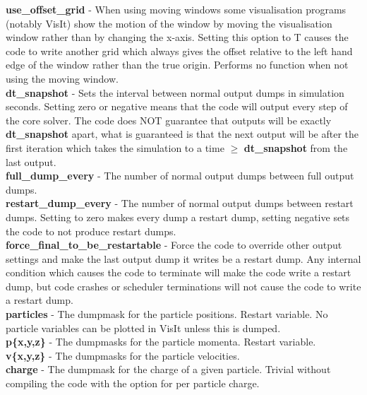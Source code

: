 \documentclass[12pt,a4paper]{article}
\newcommand{\emphtext}{\color{warwickdark} \fontfamily{phv}\selectfont\Large\bf}
\newcommand{\inlineemph}[1]{{\color{warwicklight} \bf{#1}}}
\begin{document}
{\emphtext use\_offset\_grid} - When using moving windows some visualisation
programs (notably VisIt) show the motion of the window by moving the
visualisation window rather than by changing the x-axis. Setting this option to
T causes the code to write another grid which always gives the offset relative
to the left hand edge of the window rather than the true origin. Performs no
function when not using the moving window.\\

{\emphtext dt\_snapshot} - Sets the interval between normal output dumps in
simulation seconds. Setting zero or negative means that the code will output
every step of the core solver. The code does NOT guarantee that outputs will be
exactly \inlineemph{dt\_snapshot} apart, what is guaranteed is that the next
output will be after the first iteration which takes the simulation to a time
$\ge$ \inlineemph{dt\_snapshot} from the last output.\\

{\emphtext full\_dump\_every} - The number of normal output dumps between full
output dumps.\\

{\emphtext restart\_dump\_every} - The number of normal output dumps between
restart dumps. Setting to zero makes every dump a restart dump, setting
negative sets the code to not produce restart dumps.\\

{\emphtext force\_final\_to\_be\_restartable} - Force the code to override
other output settings and make the last output dump it writes be a restart
dump. Any internal condition which causes the code to terminate will make the
code write a restart dump, but code crashes or scheduler terminations will not
cause the code to write a restart dump.\\

{\emphtext particles} - The dumpmask for the particle positions. Restart
variable. No particle variables can be plotted in VisIt unless this is
dumped.\\

{\emphtext p\{x,y,z\}} - The dumpmasks for the particle momenta. Restart
variable.\\

{\emphtext v\{x,y,z\}} - The dumpmasks for the particle velocities.\\

{\emphtext charge} - The dumpmask for the charge of a given particle. Trivial
without compiling the code with the option for per particle charge.\\
\end{document}
